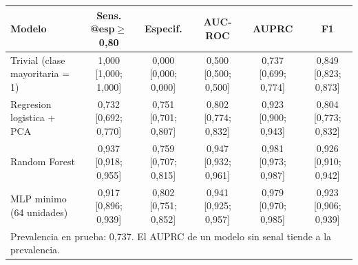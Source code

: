 \begin{tabular}{lccccc}
\hline
\textbf{Modelo} & \textbf{Sens. @esp$\geq$0,80} & \textbf{Especif.} & \textbf{AUC-ROC} & \textbf{AUPRC} & \textbf{F1} \\
\hline
Trivial (clase mayoritaria = 1) & 1,000 [1,000; 1,000] & 0,000 [0,000; 0,000] & 0,500 [0,500; 0,500] & 0,737 [0,699; 0,774] & 0,849 [0,823; 0,873] \\
Regresion logistica + PCA & 0,732 [0,692; 0,770] & 0,751 [0,701; 0,807] & 0,802 [0,774; 0,832] & 0,923 [0,900; 0,943] & 0,804 [0,773; 0,832] \\
Random Forest & 0,937 [0,918; 0,955] & 0,759 [0,707; 0,815] & 0,947 [0,932; 0,961] & 0,981 [0,973; 0,987] & 0,926 [0,910; 0,942] \\
MLP minimo (64 unidades) & 0,917 [0,896; 0,939] & 0,802 [0,751; 0,852] & 0,941 [0,925; 0,957] & 0,979 [0,970; 0,985] & 0,923 [0,906; 0,939] \\
\hline
\multicolumn{6}{l}{\footnotesize Prevalencia en prueba: 0,737. El AUPRC de un modelo sin senal tiende a la prevalencia.} \\
\hline
\end{tabular}